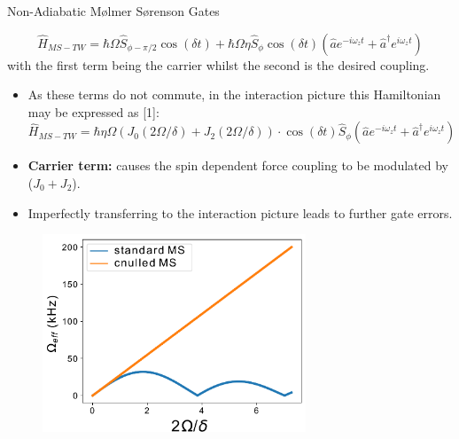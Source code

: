\documentclass[final]{beamer}
\begin{document}
\begin{frame}{}
\begin{center}
\begin{columns}[t]
\begin{column}{0.49\textwidth}
\begin{alertblock}{Non-Adiabatic Mølmer Sørenson Gates}
\begin{minipage}{0.14\linewidth}
\begin{figure}
      \end{figure}
      \end{minipage}
      \Large$$ \hat{H}_{MS-TW} = \hbar\Omega \hat{S}_{\phi-\pi/2}\cos{(\delta t)} + \hbar\Omega\eta \hat{S}_\phi\cos{(\delta t)}(\hat{a}e^{-i\omega_zt} + \hat{a}^\dagger e^{i\omega_zt})$$\normalsize
      \vspace*{0.8em} with the first term being the carrier whilst the second is the desired coupling.
      \vspace*{-1.4em}
      \begin{itemize}
      \item As these terms do not commute, in the interaction picture this Hamiltonian
            may be expressed as [1]:
      \Large$$ \hat{H}_{MS-TW} = \hbar\eta\Omega(J_0(2\Omega/\delta) + J_2(2\Omega/\delta))\cdot \cos{(\delta t)}\hat{S}_{\phi}(\hat{a}e^{-i\omega_zt} + \hat{a}^\dagger e^{i\omega_zt})$$\normalsize
      \end{itemize}
      \begin{minipage}{0.58\textwidth}
      \vspace*{-3em}
      \begin{itemize}
      \item \textbf{Carrier term:} causes the spin dependent force
        coupling to be modulated by ($J_0+J_2$).
      \item Imperfectly transferring to the interaction picture leads to further gate errors.
      \end{itemize}

      \end{minipage}
      \begin{minipage}{0.38\textwidth}
      \begin{figure}
        \includegraphics[width=0.7\textwidth]{./figs/J0J2theory.pdf}
      \end{figure}
      \end{minipage}



\end{alertblock}
\end{column}
\end{columns}
\end{center}
\end{frame}
\end{document}
